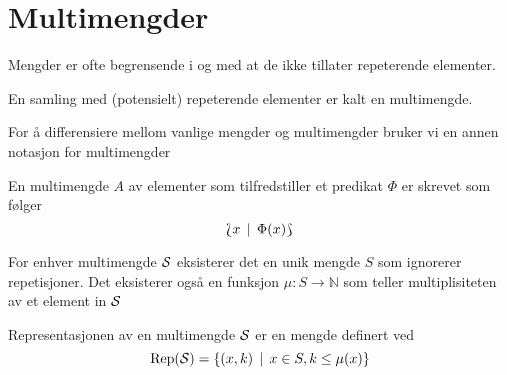 \section{Multimengder}

Mengder er ofte begrensende i og med at de ikke tillater
repeterende elementer.

\begin{definisjon}\label{def:MultMengde}
  En samling med (potensielt) repeterende elementer er
  kalt en multimengde. 
\end{definisjon}

For å differensiere mellom vanlige mengder og multimengder
bruker vi en annen notasjon for multimengder

\begin{definisjon}\label{def:Mult_Notasjon}
    En multimengde $A$ av elementer som tilfredstiller et
    predikat $\Phi$ er skrevet som følger
    \[\Lbag x\,\mid\, \Phi(x)\Rbag\]
\end{definisjon}

\begin{definisjon}\label{def:Mult_Under}
  For enhver multimengde $\mathcal{S}$ eksisterer det en unik
  mengde $S$ som ignorerer repetisjoner. Det eksisterer
  også en funksjon $\mu: S\to\mathbb{N}$ som teller
  multiplisiteten av et element in $\mathcal{S}$
\end{definisjon}

\begin{definisjon}\label{def:Rep}
   Representasjonen av en multimengde $\mathcal{S}$ er en mengde
   definert ved
   \[\textnormal{Rep}(\mathcal{S}) = \left\{(x,k)\,\mid\,x\in S, k\leq \mu(x)\right\}\]
\end{definisjon}